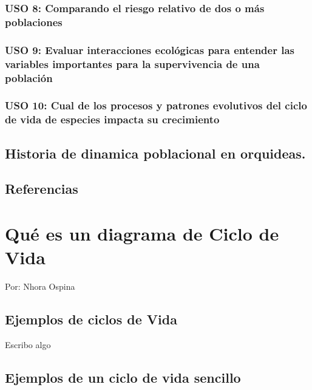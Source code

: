 \documentclass[
]{book}
\theoremstyle{definition}
\theoremstyle{definition}
\theoremstyle{definition}
\theoremstyle{definition}
\theoremstyle{remark}
\begin{document}
\subsection{USO 8: Comparando el riesgo relativo de dos o más poblaciones}\label{uso-8-comparando-el-riesgo-relativo-de-dos-o-muxe1s-poblaciones}

\subsection{USO 9: Evaluar interacciones ecológicas para entender las variables importantes para la supervivencia de una población}\label{uso-9-evaluar-interacciones-ecoluxf3gicas-para-entender-las-variables-importantes-para-la-supervivencia-de-una-poblaciuxf3n}

\subsection{USO 10: Cual de los procesos y patrones evolutivos del ciclo de vida de especies impacta su crecimiento}\label{uso-10-cual-de-los-procesos-y-patrones-evolutivos-del-ciclo-de-vida-de-especies-impacta-su-crecimiento}

\section{Historia de dinamica poblacional en orquideas.}\label{historia-de-dinamica-poblacional-en-orquideas.}

\section{Referencias}\label{referencias}

\chapter{Qué es un diagrama de Ciclo de Vida}\label{quuxe9-es-un-diagrama-de-ciclo-de-vida}

Por: Nhora Ospina

\section{Ejemplos de ciclos de Vida}\label{ejemplos-de-ciclos-de-vida}

Escribo algo

\section{Ejemplos de un ciclo de vida sencillo}\label{ejemplos-de-un-ciclo-de-vida-sencillo}
\end{document}
